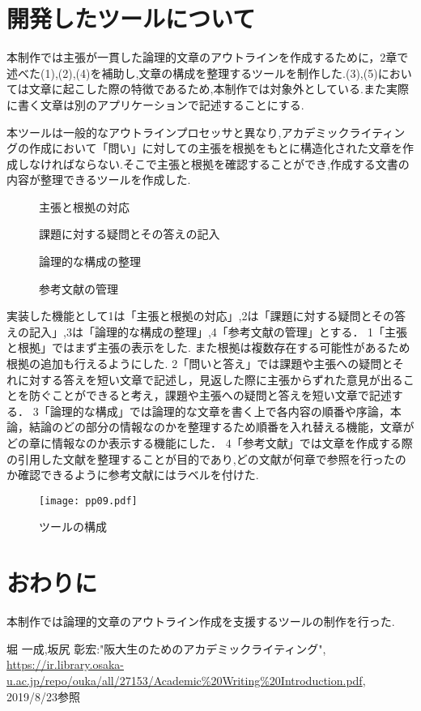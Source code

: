 \documentclass[twocolumn,10pt,a4j]{jsarticle}
\begin{document}
\section{開発したツールについて}
本制作では主張が一貫した論理的文章のアウトラインを作成するために，2章で述べた(1),(2),(4)を補助し,文章の構成を整理するツールを制作した.(3),(5)においては文章に起こした際の特徴であるため,本制作では対象外としている.また実際に書く文章は別のアプリケーションで記述することにする.

本ツールは一般的なアウトラインプロセッサと異なり,アカデミックライティングの作成において「問い」に対しての主張を根拠をもとに構造化された文章を作成しなければならない.そこで主張と根拠を確認することができ,作成する文書の内容が整理できるツールを作成した.

\begin{description}
  \item[]主張と根拠の対応
  \item[]課題に対する疑問とその答えの記入
  \item[]論理的な構成の整理
  \item[]参考文献の管理
\end{description}

実装した機能として\textcircled{\scriptsize{1}}は「主張と根拠の対応」,\textcircled{\scriptsize{2}}は「課題に対する疑問とその答えの記入」,\textcircled{\scriptsize{3}}は「論理的な構成の整理」,\textcircled{\scriptsize{4}}「参考文献の管理」とする．
\textcircled{\scriptsize{1}}「主張と根拠」ではまず主張の表示をした.
また根拠は複数存在する可能性があるため根拠の追加も行えるようにした.
\textcircled{\scriptsize{2}}「問いと答え」では課題や主張への疑問とそれに対する答えを短い文章で記述し，見返した際に主張からずれた意見が出ることを防ぐことができると考え，課題や主張への疑問と答えを短い文章で記述する．
\textcircled{\scriptsize{3}}「論理的な構成」では論理的な文章を書く上で各内容の順番や序論，本論，結論のどの部分の情報なのかを整理するため順番を入れ替える機能，文章がどの章に情報なのか表示する機能にした．
\textcircled{\scriptsize{4}}「参考文献」では文章を作成する際の引用した文献を整理することが目的であり,どの文献が何章で参照を行ったのか確認できるように参考文献にはラベルを付けた.


\begin{figure}[h]
\begin{center}
 \texttt{[image: pp09.pdf]}
\end{center}
 \caption{ツールの構成}
 \label{fig:教科書}
\end{figure}

\section{おわりに}
本制作では論理的文章のアウトライン作成を支援するツールの制作を行った.

\begin{thebibliography}{99}
 堀 一成,坂尻 彰宏:"阪大生のためのアカデミックライティング",
\url{https://ir.library.osaka-u.ac.jp/repo/ouka/all/27153/Academic%20Writing%20Introduction.pdf}, 2019/8/23参照


\end{thebibliography}
\end{document}
